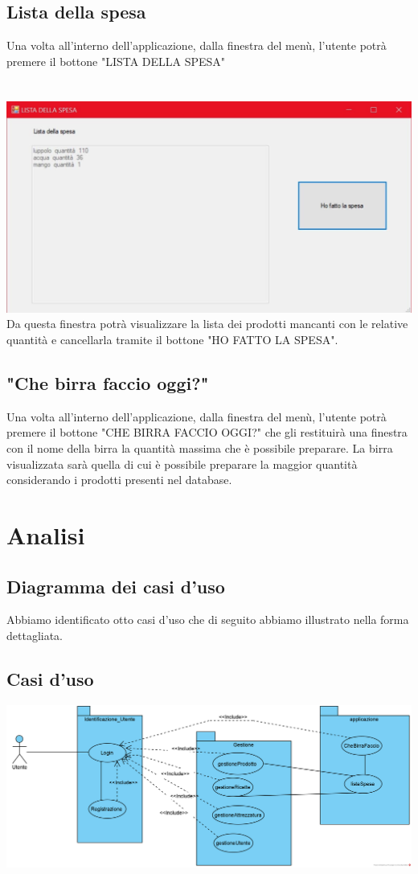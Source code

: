 \documentclass[a4paper, titlepage]{article}
\begin{document}
\subsection{Lista della spesa}
Una volta all'interno dell'applicazione, dalla finestra del menù, l'utente potrà premere il bottone "LISTA DELLA SPESA"\\\\\
\includegraphics[scale=0.30]{Immagini/form/Form ListaSpesa.jpg}
\\Da questa finestra potrà visualizzare la lista dei prodotti mancanti con le relative quantità e cancellarla tramite il bottone "HO FATTO LA SPESA".
\subsection{"Che birra faccio oggi?"}
Una volta all'interno dell'applicazione, dalla finestra del menù, l'utente potrà premere il bottone "CHE BIRRA FACCIO OGGI?" che gli restituirà una finestra con il nome della birra la quantità massima che è possibile preparare. La birra visualizzata sarà quella di cui è possibile preparare la maggior quantità considerando i prodotti presenti nel database.

\newpage
\section{Analisi}
\subsection{Diagramma dei casi d'uso}
Abbiamo identificato otto casi d'uso che di seguito abbiamo illustrato nella forma dettagliata.
\vphantom{}
\subsection{Casi d'uso}
\vphantom{}
\includegraphics[scale=0.65]{Immagini/Use Case Diagram_Brew Day!.png}
\vphantom{}
\end{document}
